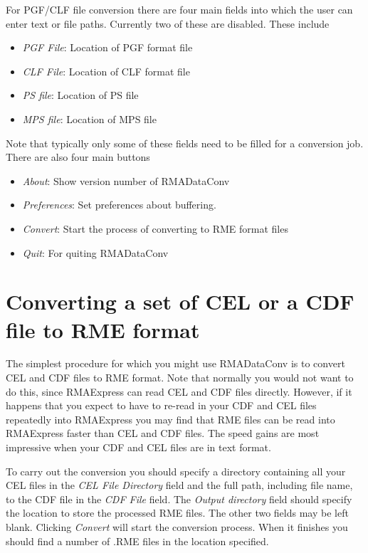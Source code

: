 \documentclass[11pt]{report}
\begin{document}
For PGF/CLF file conversion there are four main fields into which the user can enter text or file paths. Currently two of these are disabled. These include
\begin{itemize}
\item {\it PGF File}: Location of PGF format file
\item {\it CLF File}: Location of CLF format file
\item {\it PS file}: Location of PS file
\item {\it MPS file}: Location of MPS file
\end{itemize}


Note that typically only some of these fields need to be filled for a conversion job. There are also four main buttons
\begin{itemize}
\item {\it About}: Show version number of RMADataConv
\item {\it Preferences}: Set preferences about buffering.
\item {\it Convert}: Start the process of converting to RME format files
\item {\it Quit}: For quiting RMADataConv
\end{itemize}

\section{Converting a set of CEL or a CDF file to RME format}

The simplest procedure for which you might use RMADataConv is to convert CEL and CDF files to RME format. Note that normally you would not want to do this, since RMAExpress can read CEL and CDF files directly. However, if it happens that you expect to have to re-read in your CDF and CEL files repeatedly into RMAExpress you may find that RME files can be read into RMAExpress faster than CEL and CDF files. The speed gains are most impressive when your CDF and CEL files are in text format.

To carry out the conversion you should specify a directory containing all your CEL files in the {\it CEL File Directory} field and the full path, including file name, to the CDF file in the {\it CDF File} field. The {\it Output directory} field should specify the location to store the processed RME files. The other two fields may be left blank. Clicking {\it Convert} will start the conversion process. When it finishes you should find a number of .RME files in the location specified. 
\end{document}
